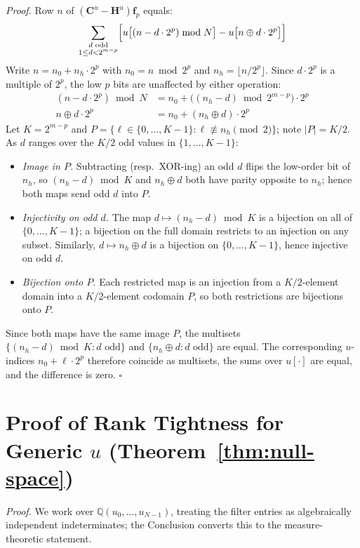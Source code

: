 \documentclass[11pt]{article}
\begin{document}
\noindent\textit{Proof.} Row $n$ of $(\mathbf{C}^u-\mathbf{H}^u)\mathbf{f}_p$ equals:
\[
    \sum_{\substack{d \text{ odd} \\ 1 \leq d < 2^{m-p}}} \Bigl[u\bigl[(n - d\cdot 2^p)\bmod N\bigr] - u\bigl[n \oplus d\cdot 2^p\bigr]\Bigr]
\]
Write $n = n_0 + n_h\cdot 2^p$ with $n_0 = n\bmod 2^p$ and $n_h = \lfloor n/2^p\rfloor$. Since $d\cdot 2^p$ is a multiple of $2^p$, the low $p$ bits are unaffected by either operation:
\begin{align*}
    (n - d\cdot 2^p)\bmod N &= n_0 + \bigl((n_h - d)\bmod 2^{m-p}\bigr)\cdot 2^p \\
    n \oplus d\cdot 2^p &= n_0 + (n_h \oplus d)\cdot 2^p
\end{align*}
Let $K = 2^{m-p}$ and $P = \{\ell \in \{0,\ldots,K-1\} : \ell \not\equiv n_h \pmod{2}\}$; note $|P| = K/2$. As $d$ ranges over the $K/2$ odd values in $\{1,\ldots,K-1\}$:
\begin{itemize}
\item \emph{Image in $P$.} Subtracting (resp.\ XOR-ing) an odd $d$ flips the low-order bit of $n_h$, so $(n_h - d)\bmod K$ and $n_h \oplus d$ both have parity opposite to $n_h$; hence both maps send odd $d$ into $P$.
\item \emph{Injectivity on odd $d$.} The map $d\mapsto(n_h-d)\bmod K$ is a bijection on all of $\{0,\ldots,K-1\}$; a bijection on the full domain restricts to an injection on any subset. Similarly, $d\mapsto n_h\oplus d$ is a bijection on $\{0,\ldots,K-1\}$, hence injective on odd $d$.
\item \emph{Bijection onto $P$.} Each restricted map is an injection from a $K/2$-element domain into a $K/2$-element codomain $P$, so both restrictions are bijections onto $P$.
\end{itemize}
Since both maps have the same image $P$, the multisets $\{(n_h-d)\bmod K : d\text{ odd}\}$ and $\{n_h\oplus d : d\text{ odd}\}$ are equal. The corresponding $u$-indices $n_0 + \ell\cdot 2^p$ therefore coincide as multisets, the sums over $u[\cdot]$ are equal, and the difference is zero. $\square$

\section{Proof of Rank Tightness for Generic $u$ (Theorem~\ref{thm:null-space})}
\label{app:rank-tightness}

\noindent\textit{Proof.} We work over $\mathbb{Q}(u_0,\ldots,u_{N-1})$, treating the filter entries as algebraically independent indeterminates; the Conclusion converts this to the measure-theoretic statement.
\end{document}
